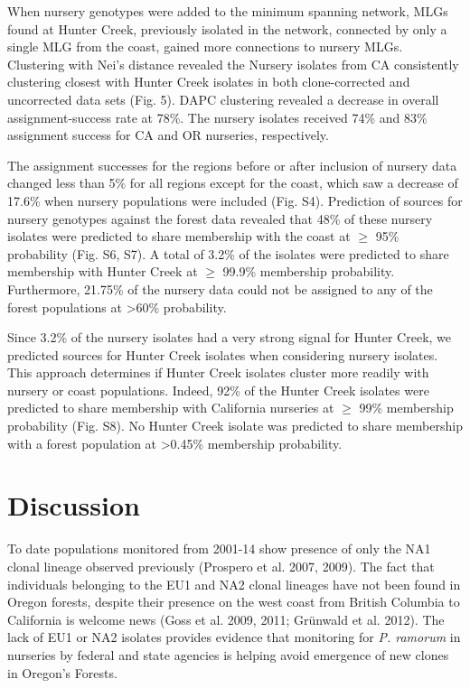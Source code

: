 \documentclass[double,12pt]{beavtex}
\begin{document}
  When nursery genotypes were added to the minimum spanning network, MLGs
  found at Hunter Creek, previously isolated in the network, connected by
  only a single MLG from the coast, gained more connections to nursery
  MLGs. Clustering with Nei's distance revealed the Nursery isolates from
  CA consistently clustering closest with Hunter Creek isolates in both
  clone-corrected and uncorrected data sets (Fig. 5). DAPC clustering
  revealed a decrease in overall assignment-success rate at 78\%. The
  nursery isolates received 74\% and 83\% assignment success for CA and OR
  nurseries, respectively.
  
  The assignment successes for the regions before or after inclusion of
  nursery data changed less than 5\% for all regions except for the coast,
  which saw a decrease of 17.6\% when nursery populations were included
  (Fig. S4). Prediction of sources for nursery genotypes against the
  forest data revealed that 48\% of these nursery isolates were predicted
  to share membership with the coast at \(\geq\) 95\% probability (Fig.
  S6, S7). A total of 3.2\% of the isolates were predicted to share
  membership with Hunter Creek at \(\geq\) 99.9\% membership probability.
  Furthermore, 21.75\% of the nursery data could not be assigned to any of
  the forest populations at \textgreater 60\% probability.
  
  Since 3.2\% of the nursery isolates had a very strong signal for Hunter
  Creek, we predicted sources for Hunter Creek isolates when considering
  nursery isolates. This approach determines if Hunter Creek isolates
  cluster more readily with nursery or coast populations. Indeed, 92\% of
  the Hunter Creek isolates were predicted to share membership with
  California nurseries at \(\geq\) 99\% membership probability (Fig. S8).
  No Hunter Creek isolate was predicted to share membership with a forest
  population at \textgreater0.45\% membership probability.
  
  \section{Discussion}\label{discussion}
  
  To date populations monitored from 2001-14 show presence of only the NA1
  clonal lineage observed previously (Prospero et al. 2007, 2009). The
  fact that individuals belonging to the EU1 and NA2 clonal lineages have
  not been found in Oregon forests, despite their presence on the west
  coast from British Columbia to California is welcome news (Goss et al.
  2009, 2011; Grünwald et al. 2012). The lack of EU1 or NA2 isolates
  provides evidence that monitoring for \emph{P. ramorum} in nurseries by
  federal and state agencies is helping avoid emergence of new clones in
  Oregon's Forests.
  
\end{document}
